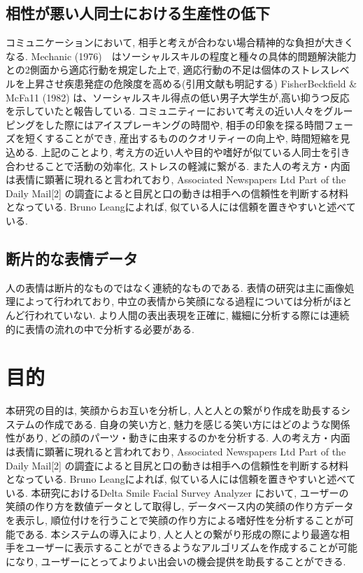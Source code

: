 \subsection{相性が悪い人同士における生産性の低下}
コミュニケーションにおいて, 相手と考えが合わない場合精神的な負担が大きくなる.
Mechanic (1976)　はソーシャルスキルの程度と種々の具体的問題解決能力との2側面から適応行動を規定した上で,
適応行動の不足は個体のストレスレベルを上昇させ疾患発症の危険度を高める(引用文献も明記する)
FisherBeckfield \& McFa11 (1982) は、ソーシャルスキル得点の低い男子大学生が,高い抑うつ反応を示していたと報告している.
コミュニティーにおいて考えの近い人々をグルーピングをした際にはアイスプレーキングの時間や, 相手の印象を探る時間フェーズを短くすることができ,
産出するもののクオリティーの向上や, 時間短縮を見込める.
上記のことより, 考え方の近い人や目的や嗜好が似ている人同士を引き合わせることで活動の効率化, ストレスの軽減に繋がる.
また人の考え方・内面は表情に顕著に現れると言われており, Associated Newspapers Ltd Part of the Daily Mail[2]
の調査によると目尻と口の動きは相手への信頼性を判断する材料となっている. Bruno Leangによれば, 似ている人には信頼を置きやすいと述べている.

\subsection{断片的な表情データ}
人の表情は断片的なものではなく連続的なものである. 表情の研究は主に画像処理によって行われており,
中立の表情から笑顔になる過程については分析がほとんど行われていない.
より人間の表出表現を正確に, 繊細に分析する際には連続的に表情の流れの中で分析する必要がある.

\section{目的}
本研究の目的は, 笑顔からお互いを分析し, 人と人との繋がり作成を助長するシステムの作成である.
自身の笑い方と, 魅力を感じる笑い方にはどのような関係性があり, どの顔のパーツ・動きに由来するのかを分析する.
人の考え方・内面は表情に顕著に現れると言われており, Associated Newspapers Ltd Part of the Daily Mail[2]
の調査によると目尻と口の動きは相手への信頼性を判断する材料となっている. Bruno Leangによれば, 似ている人には信頼を置きやすいと述べている.
本研究におけるDelta Smile Facial Survey Analyzer において, ユーザーの笑顔の作り方を数値データとして取得し,
データベース内の笑顔の作り方データを表示し, 順位付けを行うことで笑顔の作り方による嗜好性を分析することが可能である.
本システムの導入により, 人と人との繋がり形成の際により最適な相手をユーザーに表示することができるようなアルゴリズムを作成することが可能になり,
ユーザーにとってよりよい出会いの機会提供を助長することができる.

